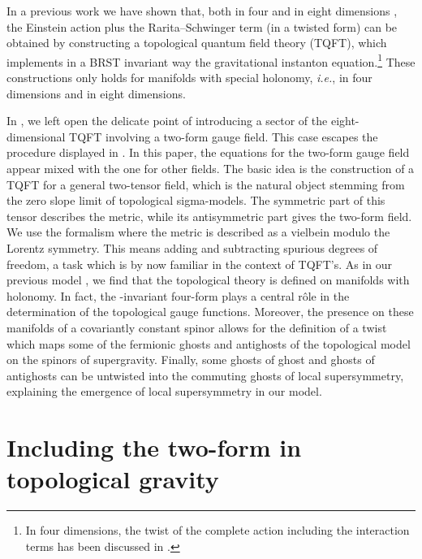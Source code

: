 \documentclass[a4paper,12pt]{article}
\def\L{l}
\begin{document}
In a previous work we have shown that, both in four \cite{BT1} and in
eight dimensions \cite{BT2}, the   Einstein action plus the
Rarita--Schwinger term (in a twisted form) can  be obtained  by
constructing a topological quantum field theory (TQFT), which
implements in a BRST invariant way the gravitational instanton
equation.\footnote{In four dimensions, the twist of the complete action
including the interaction terms has been discussed in \cite{mespe}.}
These constructions only holds for  manifolds with special holonomy,
{\em i.e.}, \coordHE{} in four dimensions and \coordHE{} in eight dimensions.

In \cite{BT2}, we left open the delicate point of 
introducing  a sector of the eight-dimensional TQFT involving a two-form
gauge field. This case escapes the
procedure displayed in \cite {laroche}. 
In this paper, the equations for the two-form gauge field
appear mixed with the one for other fields. 
The basic idea is the construction of a TQFT for a general two-tensor
field, which is the natural object stemming from the
zero slope limit of topological sigma-models. The symmetric part
of this tensor describes the metric,
while its antisymmetric part gives the two-form field.
We use the formalism where the metric is described as 
a vielbein modulo the Lorentz symmetry.
This means adding and subtracting spurious
degrees of freedom, a task which is by now familiar in the context of
TQFT's. 
As in our previous model \cite{BT2}, 
we find that the topological theory is defined on manifolds with
\coordHE{} holonomy. In fact, the \coordHE{}-invariant four-form
plays a central r\^ole in the determination of the topological gauge functions. 
Moreover, the presence on these manifolds of a covariantly constant
spinor allows for the definition of a twist \cite{BT2}
which maps some of the fermionic ghosts and antighosts of the topological
model on the spinors of \coordHE{} supergravity.
Finally, some ghosts of ghost and ghosts of antighosts can be untwisted
into the commuting ghosts of local supersymmetry, explaining the emergence
of local supersymmetry in our model.

\let\w=\wedge
\let\o=\omega
\let\O=\Omega
\def\L{ {\cal L}}
 \section{Including the two-form in topological gravity }  
\end{document}
